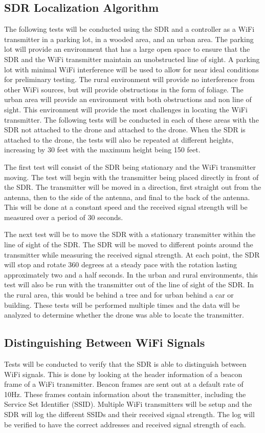 \subsection{SDR Localization Algorithm}
The following tests will be conducted using the SDR and a controller as a WiFi transmitter in a parking lot, in a wooded area, and an urban area. The parking lot will provide an environment that has a large open space to ensure that the SDR and the WiFi transmitter maintain an unobstructed line of sight. A parking lot with minimal WiFi interference will be used to allow for near ideal conditions for preliminary testing. The rural environment will provide no interference from other WiFi sources, but will provide obstructions in the form of foliage. The urban area will provide an environment with both obstructions and non line of sight. This environment will provide the most challenges in locating the WiFi transmitter. The following tests will be conducted in each of these areas with the SDR not attached to the drone and attached to the drone. When the SDR is attached to the drone, the tests will also be repeated at different heights, increasing by 30 feet with the maximum height being 150 feet.\par 
The first test will consist of the SDR being stationary and the WiFi transmitter moving. The test will begin with the transmitter being placed directly in front of the SDR. The transmitter will be moved in a direction, first straight out from the antenna, then to the side of the antenna, and final to the back of the antenna. This will be done at a constant speed and the received signal strength will be measured over a period of 30 seconds.\par 
The next test will be to move the SDR with a stationary transmitter within the line of sight of the SDR. The SDR will be moved to different points around the transmitter while measuring the received signal strength. At each point, the SDR will stop and rotate 360 degrees at a steady pace with the rotation lasting approximately two and a half seconds. In the urban and rural environments, this test will also be run with the transmitter out of the line of sight of the SDR. In the rural area, this would be behind a tree and for urban behind a car or building. These tests will be performed multiple times and the data will be analyzed to determine whether the drone was able to locate the transmitter.\par 

\subsection{Distinguishing Between WiFi Signals}
Tests will be conducted to verify that the SDR is able to distinguish between WiFi signals. This is done by looking at the header information of a beacon frame of a WiFi transmitter. Beacon frames are sent out at a default rate of 10Hz. These frames contain information about the transmitter, including the Service Set Identifier (SSID). Multiple WiFi transmitters will be setup and the SDR will log the different SSIDs and their received signal strength. The log will be verified to have the correct addresses and received signal strength of each. 

